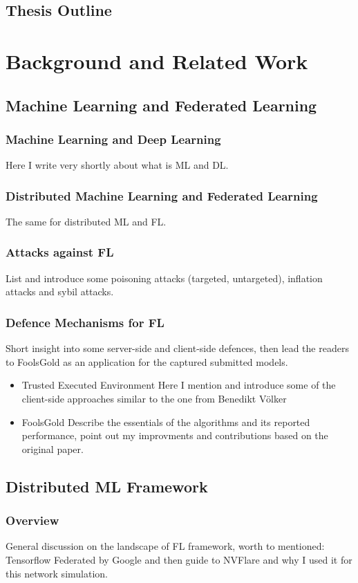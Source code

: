 \documentclass{article}
\begin{document}
\subsection{Thesis Outline}

\section{Background and Related Work}
\subsection{Machine Learning and Federated Learning}
\subsubsection{Machine Learning and Deep Learning}
Here I write very shortly about what is ML and DL.
\subsubsection{Distributed Machine Learning and Federated Learning}
The same for distributed ML and FL.
\subsubsection{Attacks against FL}
List and introduce some poisoning attacks (targeted, untargeted), inflation
attacks and sybil attacks.
\subsubsection{Defence Mechanisms for FL}
Short insight into some server-side and client-side defences, then lead the
readers to FoolsGold as an application for the captured submitted models.
\begin{itemize}
    \item Trusted Executed Environment
    Here I mention and introduce some of the client-side approaches similar to the
    one from Benedikt V\"olker
    \item FoolsGold
    Describe the essentials of the algorithms and its reported performance,
    point out my improvments and contributions based on the original paper.
\end{itemize}

\subsection{Distributed ML Framework}
\subsubsection{Overview}
General discussion on the landscape of FL framework, worth to mentioned:
Tensorflow Federated by Google and then guide to NVFlare and why I used it for
this network simulation.
\end{document}

